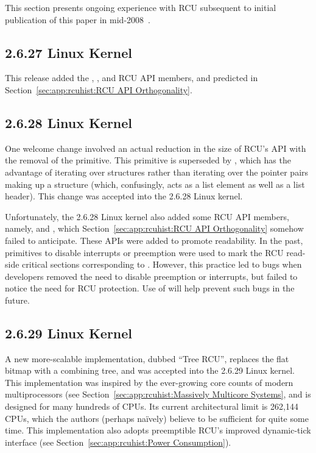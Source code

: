 This section presents ongoing experience with RCU subsequent to initial
publication of this paper in mid-2008~\cite{PaulEMcKenney2008RCUOSR}.

\subsection{2.6.27 Linux Kernel}

This release added the
,
, and
 RCU API members,
and predicted in Section~\ref{sec:app:rcuhist:RCU API Orthogonality}.

\subsection{2.6.28 Linux Kernel}

One welcome change involved an actual reduction in the size of RCU's
API with the removal of the  primitive.
This primitive is superseded by ,
which has the advantage of iterating over structures rather than
iterating over the pointer pairs making up a 
structure (which, confusingly, acts as a list element as well
as a list header).
This change was accepted into the 2.6.28 Linux kernel.

Unfortunately, the 2.6.28 Linux kernel also added some RCU API
members, namely,  and
, which Section~\ref{sec:app:rcuhist:RCU API Orthogonality}
somehow failed to anticipate.
These APIs were added to promote readability.
In the past, primitives to disable interrupts or preemption were used
to mark the RCU read-side critical sections corresponding to
.
However, this practice led to bugs when developers removed the need
to disable preemption or interrupts, but failed to notice the need
for RCU protection.
Use of  will help prevent such bugs in the
future.

\subsection{2.6.29 Linux Kernel}

A new more-scalable implementation, dubbed ``Tree RCU'', replaces
the flat bitmap with a combining tree, and was accepted into the 2.6.29
Linux kernel.
This implementation was inspired by the ever-growing core counts of
modern multiprocessors (see Section~\ref{sec:app:rcuhist:Massively Multicore Systems},
and is designed for many hundreds of CPUs.
Its current architectural limit is 262,144 CPUs, which the authors
(perhaps na\"ively) believe to be sufficient for quite some time.
This implementation also adopts preemptible RCU's improved dynamic-tick
interface (see Section~\ref{sec:app:rcuhist:Power Consumption}).

